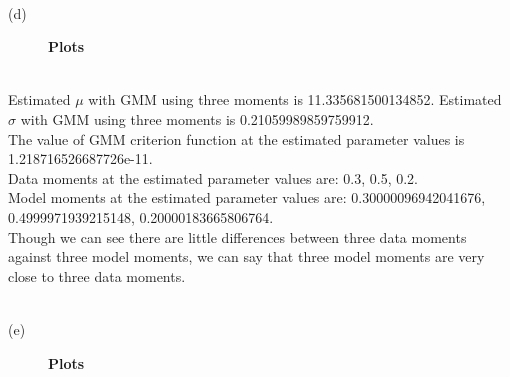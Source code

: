 \documentclass[letterpaper,12pt]{article}
\theoremstyle{definition}
\begin{document}
\textbf \\ {(d)} 
\begin{figure}[H]\centering\captionsetup{width=5.0in}
  \caption{\textbf{Plots}}\label{Fig_1}
 \end{figure}
\noindent\\  
Estimated $\mu$ with GMM using three moments is 11.335681500134852.
Estimated $\sigma$ with GMM using three moments is 0.21059989859759912.\\
The value of GMM criterion function at the estimated parameter values is\\ 1.218716526687726e-11.\\
Data moments at the estimated parameter values are: 0.3, 0.5, 0.2.\\
Model moments at the estimated parameter values are: 0.30000096942041676,\\ 0.4999971939215148, 0.20000183665806764.\\
Though we can see there are little differences between three data moments against three model moments, we can say that three model moments are very close to three data moments.

 \newpage
 
 \textbf \\ {(e)} 
 \begin{figure}[H]\centering\captionsetup{width=5.0in}
  \caption{\textbf{Plots}}\label{Fig_1}
 \end{figure}
 
\end{document}
